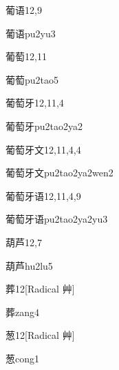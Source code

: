 \begin{entry}{葡语}{12,9}
  \begin{phonetics}{葡语}{pu2yu3}
  \end{phonetics}
\end{entry}

\begin{entry}{葡萄}{12,11}
  \begin{phonetics}{葡萄}{pu2tao5}
  \end{phonetics}
\end{entry}

\begin{entry}{葡萄牙}{12,11,4}
  \begin{phonetics}{葡萄牙}{pu2tao2ya2}
  \end{phonetics}
\end{entry}

\begin{entry}{葡萄牙文}{12,11,4,4}
  \begin{phonetics}{葡萄牙文}{pu2tao2ya2wen2}
  \end{phonetics}
\end{entry}

\begin{entry}{葡萄牙语}{12,11,4,9}
  \begin{phonetics}{葡萄牙语}{pu2tao2ya2yu3}
  \end{phonetics}
\end{entry}

\begin{entry}{葫芦}{12,7}
  \begin{phonetics}{葫芦}{hu2lu5}
  \end{phonetics}
\end{entry}

\begin{entry}{葬}{12}[Radical 艸]
  \begin{phonetics}{葬}{zang4}
  \end{phonetics}
\end{entry}

\begin{entry}{葱}{12}[Radical 艸]
  \begin{phonetics}{葱}{cong1}
  \end{phonetics}
\end{entry}

